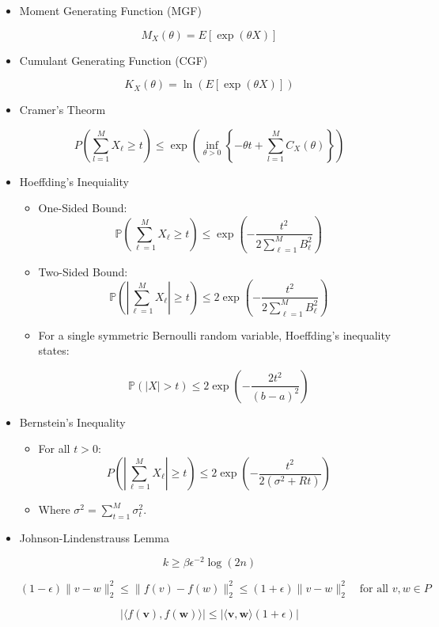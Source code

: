 \documentclass{article}
\begin{document}
\begin{itemize}
\item Moment Generating Function (MGF)

\[
M_X(\theta) = E[\exp(\theta X)]
\]

\item Cumulant Generating Function (CGF)

\[
K_X(\theta) = \ln(E[\exp(\theta X)])
\]

\item Cramer's Theorm

\[
P\left(\sum_{l=1}^{M} X_\ell \geq t\right) \leq \exp\left(\inf_{\theta > 0}\left\{-\theta t + \sum_{l=1}^{M} C_X(\theta)\right\}\right)
\]

\item Hoeffding's Inequiality

\begin{itemize}

\item One-Sided Bound:
    \[
    \mathbb{P}\left(\sum_{\ell=1}^{M} X_\ell \geq t\right) \leq \exp\left(-\frac{t^2}{2\sum_{\ell=1}^{M} B_\ell^2}\right)
    \]

    \item Two-Sided Bound:
    \[
    \mathbb{P}\left(\left|\sum_{\ell=1}^{M} X_\ell\right| \geq t\right) \leq 2 \exp\left(-\frac{t^2}{2\sum_{\ell=1}^{M} B_\ell^2}\right)
    \]

    \item For a single symmetric Bernoulli random variable, Hoeffding's inequality states:

\[
\mathbb{P} \left( |X| > t \right) \leq 2 \exp \left( -\frac{2t^2}{(b-a)^2} \right)
\]

\end{itemize}

\item Bernstein's Inequality

\begin{itemize}[leftmargin=*]
    \item For all $t > 0$:
    \[
    P\left( \left| \sum_{\ell=1}^{M} X_\ell \right| \geq t \right) \leq 2 \exp\left( -\frac{t^2}{2(\sigma^2 + Rt)} \right)
    \]
    \item Where $\sigma^2 = \sum_{t=1}^{M} \sigma_t^2$.
\end{itemize}

\item Johnson-Lindenstrauss Lemma 



\[
k \geq \beta \epsilon^{-2} \log(2n)
\]

       \[
        (1 - \epsilon) \|v - w\|^2_2 \leq \|f(v) - f(w)\|^2_2 \leq (1 + \epsilon) \|v - w\|^2_2 \quad \text{for all } v, w \in P
         \]



\[ |\langle f(\mathbf{v}), f(\mathbf{w}) \rangle| \leq |\langle \mathbf{v}, \mathbf{w} \rangle (1 + \epsilon)| \]


\end{itemize}
\end{document}
